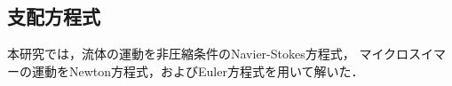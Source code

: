 \subsection{支配方程式}
本研究では，流体の運動を非圧縮条件のNavier-Stokes方程式，
マイクロスイマーの運動をNewton方程式，およびEuler方程式を用いて解いた．





